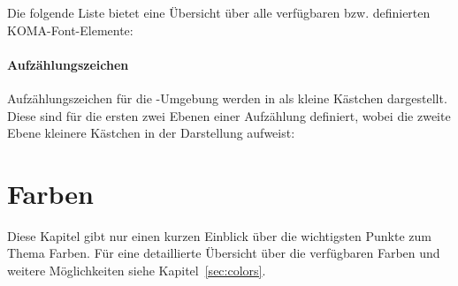 Die folgende Liste bietet eine Übersicht über alle verfügbaren bzw.
definierten KOMA-Font-Elemente:

\begin{desctable}
\end{desctable}


\paragraph{Aufzählungszeichen}

Aufzählungszeichen für die -Umgebung werden in \tubslatex
als kleine Kästchen dargestellt.
Diese sind für die ersten zwei Ebenen einer Aufzählung definiert, wobei
die zweite Ebene kleinere Kästchen in der Darstellung aufweist:
\begin{center}
\end{center}



\section{Farben}

Diese Kapitel gibt nur einen kurzen Einblick über die wichtigsten Punkte
zum Thema Farben. Für eine detaillierte Übersicht über die verfügbaren Farben
und weitere Möglichkeiten siehe Kapitel~\ref{sec:colors}.%

